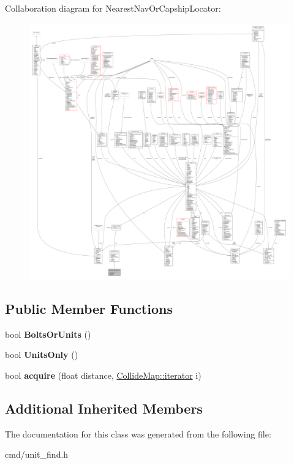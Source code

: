 Collaboration diagram for Nearest\+Nav\+Or\+Capship\+Locator\+:
\nopagebreak
\begin{figure}[H]
\begin{center}
\leavevmode
\includegraphics[width=350pt]{dd/d5c/classNearestNavOrCapshipLocator__coll__graph}
\end{center}
\end{figure}
\subsection*{Public Member Functions}
\begin{DoxyCompactItemize}
\item 
bool {\bfseries Bolts\+Or\+Units} ()\hypertarget{classNearestNavOrCapshipLocator_ac402205e3a6174aad7b6b858180519d3}{}\label{classNearestNavOrCapshipLocator_ac402205e3a6174aad7b6b858180519d3}

\item 
bool {\bfseries Units\+Only} ()\hypertarget{classNearestNavOrCapshipLocator_a90503f38c46522bb64db7692605098ff}{}\label{classNearestNavOrCapshipLocator_a90503f38c46522bb64db7692605098ff}

\item 
bool {\bfseries acquire} (float distance, \hyperlink{classCollidable}{Collide\+Map\+::iterator} i)\hypertarget{classNearestNavOrCapshipLocator_a4a7c8e63c6817cf49d27ee5435aee5f6}{}\label{classNearestNavOrCapshipLocator_a4a7c8e63c6817cf49d27ee5435aee5f6}

\end{DoxyCompactItemize}
\subsection*{Additional Inherited Members}


The documentation for this class was generated from the following file\+:\begin{DoxyCompactItemize}
\item 
cmd/unit\+\_\+find.\+h\end{DoxyCompactItemize}
